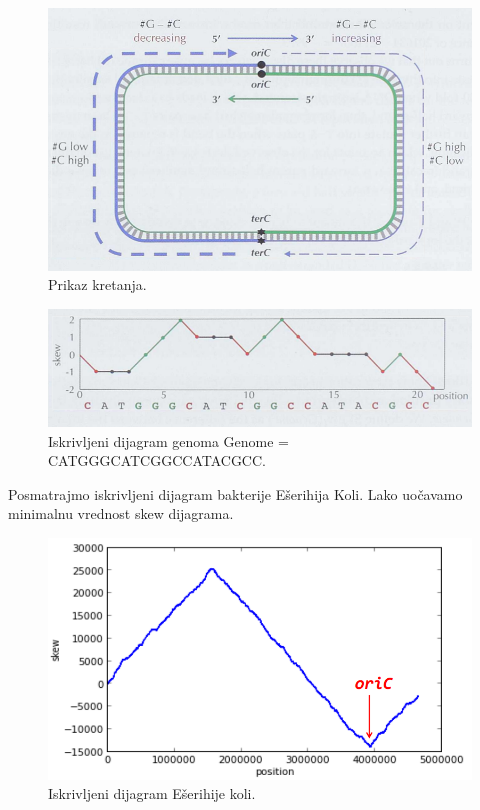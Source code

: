 \begin{figure}[h]
\caption{Prikaz kretanja.}
\centering
\includegraphics[width=1\textwidth]{poglavlja/1/slike/Polulanci_CG.png}
\end{figure} 

\begin{figure}[h]
\caption{Iskrivljeni dijagram genoma Genome = CATGGGCATCGGCCATACGCC.}
\centering
\includegraphics[width=1\textwidth]{poglavlja/1/slike/skew.png}
\end{figure} 

Posmatrajmo iskrivljeni dijagram bakterije Ešerihija Koli. Lako uočavamo minimalnu vrednost skew dijagrama.

\begin{figure}[h]
\caption{Iskrivljeni dijagram Ešerihije koli.}
\centering
\includegraphics[width=1\textwidth]{poglavlja/1/slike/Ecoli_oriC.png}
\end{figure} 

